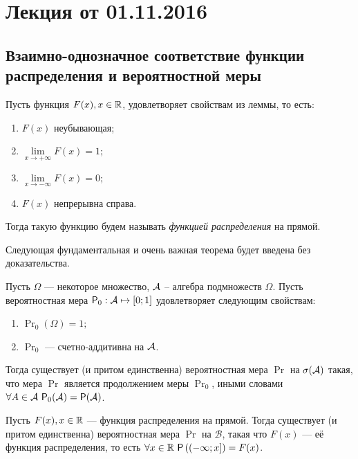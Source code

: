 \section{Лекция от 01.11.2016}

\subsection{Взаимно-однозначное соответствие функции распределения и вероятностной меры}
\begin{definition}
	Пусть функция $ F(x), x \in \mathbb{R} $, удовлетворяет свойствам из леммы, то есть: 
	\begin{enumerate}
		\item
		$F(x)$ неубывающая;
		\item
		\(\lim\limits_{x\to +\infty} F(x)= 1;\)
		\item
		\(\lim\limits_{x\to -\infty} F(x)= 0;\)
		\item
		$F(x)$ непрерывна справа.
	\end{enumerate}   
	Тогда такую функцию будем называть \emph{функцией распределения} на прямой.
\end{definition}

Следующая фундаментальная и очень важная теорема будет введена без доказательства.

\begin{theorem}
	Пусть $ \Omega $ --- некоторое множество, $ \mathcal{A} $ -- алгебра подмножеств $ \Omega $. Пусть вероятностная мера \(\Pr_0: \A \mapsto [0; 1] \) удовлетворяет следующим свойствам:
	\begin{enumerate}
		\item
		\( \Pr_0(\Omega) = 1;  \)
		\item 
		\( \Pr_0 \) --- счетно-аддитивна на \(\mathcal{A} \).
	\end{enumerate}     
	Тогда существует (и притом единственна) вероятностная мера $ \Pr $ на $ \sigma(\mathcal{A}) $ такая, что мера $ \Pr $ является продолжением меры $ \Pr_0 $, иными словами \(\forall A \in \A \ \Pr_0(\A) = \Pr(\A)   \).
\end{theorem}

\begin{theorem}
	Пусть \(F(x), x \in \mathbb{R} \) --- функция распределения на прямой. Тогда существует (и притом единственна) вероятностная мера $ \Pr $ на \(\mathcal{B} \), такая что $ F(x) $ --- её функция распределения, то есть \(\forall x \in \R \ \Pr\left((-\infty; x] \right) = F(x) \).
\end{theorem}


